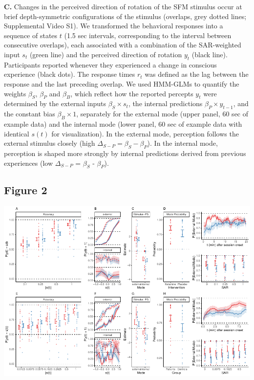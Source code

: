 \documentclass[
]{article}
\begin{document}
\textbf{C.} Changes in the perceived direction of rotation of the SFM
stimulus occur at brief depth-symmetric configurations of the stimulus
(overlaps, grey dotted lines; Supplemental Video S1). We transformed the
behavioral responses into a sequence of states \(t\) (1.5 sec intervals,
corresponding to the interval between consecutive overlaps), each
associated with a combination of the SAR-weighted input \(s_t\) (green
line) and the perceived direction of rotation \(y_t\) (black line).
Participants reported whenever they experienced a change in conscious
experience (black dots). The response times \(r_t\) was defined as the
lag between the response and the last preceding overlap. We used
HMM-GLMs to quantify the weights \(\beta_S\), \(\beta_P\) and
\(\beta_B\), which reflect how the reported percepts \(y_t\) were
determined by the external inputs \(\beta_S \times s_t\), the internal
predictions \(\beta_P \times y_{t-1}\), and the constant bias
\(\beta_B \times 1\), separately for the external mode (upper panel, 60
sec of example data) and the internal mode (lower panel, 60 sec of
example data with identical \(s(t)\) for visualization). In the external
mode, perception follows the external stimulus closely (high
\(\Delta_{S-P} = \beta_S - \beta_P\)). In the internal mode, perception
is shaped more strongly by internal predictions derived from previous
experiences (low \(\Delta_{S-P}\) = \(\beta_S\) - \(\beta_P\)).

\newpage

\subsection{Figure 2}\label{figure-2}

\includegraphics{modes_ketamine_scz_files/figure-latex/Figure_2-1.pdf}
\end{document}
